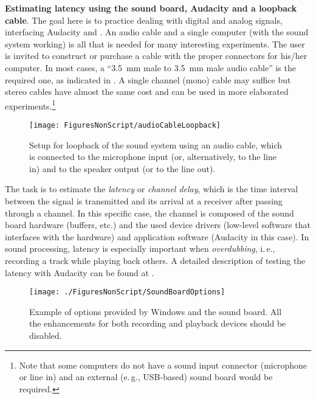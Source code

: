 \bApplication \textbf{Estimating latency using the sound board, Audacity and a loopback cable}.
\label{app:latency}
The goal here is to practice dealing with digital and analog signals, interfacing Audacity and {\matlab}.
An audio cable and a single computer (with the sound system working) is all that is needed for many interesting experiments. The user is invited to construct or purchase a cable with the proper connectors for his/her computer. In most cases, a ``3.5~mm male to 3.5~mm male audio cable'' is the required one, as indicated in . A single channel (mono) cable may suffice but stereo cables have almost the same cost and can be used in more elaborated experiments.\footnote{Note that some computers do not have a sound input connector (microphone or line in) and an external (e.\,g., USB-based) sound board would be required.}

\begin{figure}
	\centering
		\texttt{[image: FiguresNonScript/audioCableLoopback]}
	\caption[Setup for loopback of the sound system using an audio cable.]{Setup for loopback of the sound system using an audio cable, which is connected to the microphone input (or, alternatively, to the line in) and to the speaker output (or to the line out).\label{fig:audioCableLoopback}}
\end{figure}

The task is to estimate the \emph{latency} or \emph{channel delay}, which is the time interval between the signal is transmitted and its arrival at a receiver after passing through a channel. In this specific case, the channel is composed of the sound board hardware (buffers, etc.) and the used device drivers (low-level software that interfaces with the hardware) and application software (Audacity in this case). In sound processing, latency is especially important when \emph{overdubbing}, i.\,e., recording a track while playing back others. A detailed description of testing the latency with Audacity can be found at
. 

\begin{figure}
\centering
\texttt{[image: ./FiguresNonScript/SoundBoardOptions]}
\caption{Example of options provided by Windows and the sound board. All the enhancements for both recording and playback devices should be disabled.\label{fig:SoundBoardOptions}}
\end{figure}


